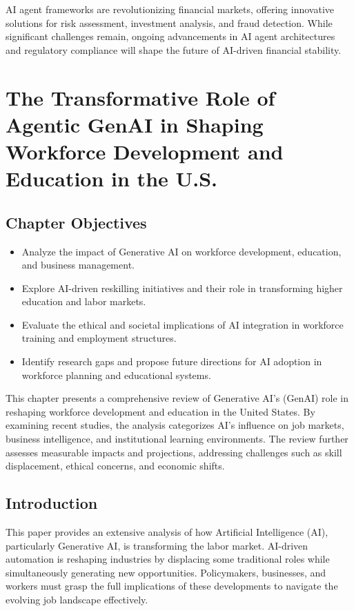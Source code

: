 \documentclass[a4paper,headinclude=on,footinclude=on,12pt,oneside]{scrbook}
\begin{document}
AI agent frameworks are revolutionizing financial markets, offering innovative solutions for risk assessment, investment analysis, and fraud detection. While significant challenges remain, ongoing advancements in AI agent architectures and regulatory compliance will shape the future of AI-driven financial stability.




\chapter{The Transformative Role of Agentic GenAI in Shaping Workforce Development and Education in the U.S.}

\section*{Chapter Objectives}
\begin{itemize}
	\item Analyze the impact of Generative AI on workforce development, education, and business management.
	\item Explore AI-driven reskilling initiatives and their role in transforming higher education and labor markets.
	\item Evaluate the ethical and societal implications of AI integration in workforce training and employment structures.
	\item Identify research gaps and propose future directions for AI adoption in workforce planning and educational systems.
\end{itemize}

This chapter presents a comprehensive review of Generative AI's (GenAI) role in reshaping workforce development and education in the United States. By examining recent studies, the analysis categorizes AI's influence on job markets, business intelligence, and institutional learning environments. The review further assesses measurable impacts and projections, addressing challenges such as skill displacement, ethical concerns, and economic shifts.

\section*{Introduction}

This paper provides an extensive analysis of how Artificial Intelligence (AI), particularly Generative AI, is transforming the labor market. AI-driven automation is reshaping industries by displacing some traditional roles while simultaneously generating new opportunities. Policymakers, businesses, and workers must grasp the full implications of these developments to navigate the evolving job landscape effectively.
\end{document}
